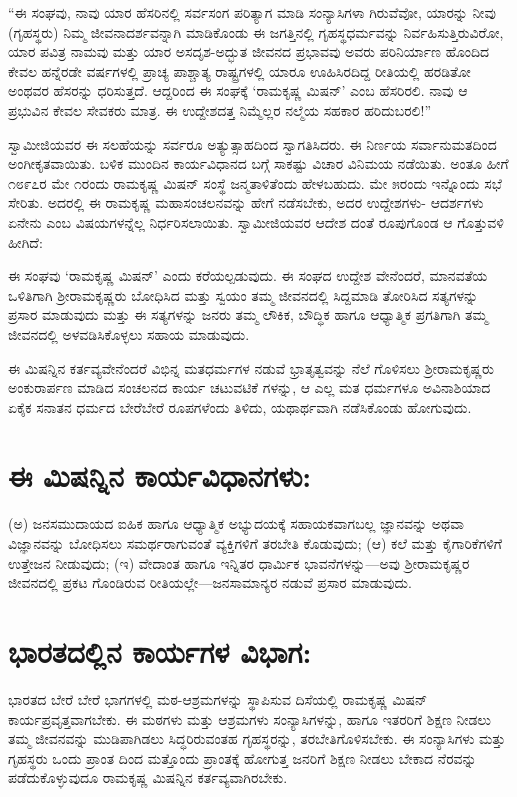 “ಈ ಸಂಘವು, ನಾವು ಯಾರ ಹೆಸರಿನಲ್ಲಿ ಸರ್ವಸಂಗ ಪರಿತ್ಯಾಗ ಮಾಡಿ ಸಂನ್ಯಾಸಿಗಳಾ ಗಿರುವೆವೋ, ಯಾರನ್ನು ನೀವು (ಗೃಹಸ್ಥರು) ನಿಮ್ಮ ಜೀವನಾದರ್ಶವನ್ನಾಗಿ ಮಾಡಿಕೊಂಡು ಈ ಜಗತ್ತಿನಲ್ಲಿ ಗೃಹಸ್ಥಧರ್ಮವನ್ನು ನಿರ್ವಹಿಸುತ್ತಿರುವಿರೋ, ಯಾರ ಪವಿತ್ರ ನಾಮವು ಮತ್ತು ಯಾರ ಅಸದೃಶ-ಅದ್ಭುತ ಜೀವನದ ಪ್ರಭಾವವು ಅವರು ಪರಿನಿರ್ಯಾಣ ಹೊಂದಿದ ಕೇವಲ ಹನ್ನೆರಡೇ ವರ್ಷಗಳಲ್ಲಿ ಪ್ರಾಚ್ಯ ಪಾಶ್ಚಾತ್ಯ ರಾಷ್ಟ್ರಗಳಲ್ಲಿ ಯಾರೂ ಊಹಿಸಿರದಿದ್ದ ರೀತಿಯಲ್ಲಿ ಹರಡಿತೋ ಅಂಥವರ ಹೆಸರನ್ನು ಧರಿಸುತ್ತದೆ. ಆದ್ದರಿಂದ ಈ ಸಂಘಕ್ಕೆ ‘ರಾಮಕೃಷ್ಣ ಮಿಷನ್​’ ಎಂಬ ಹೆಸರಿರಲಿ. ನಾವು ಆ ಪ್ರಭುವಿನ ಕೇವಲ ಸೇವಕರು ಮಾತ್ರ. ಈ ಉದ್ದೇಶದತ್ತ ನಿಮ್ಮೆಲ್ಲರ ನಲ್ಮೆಯ ಸಹಕಾರ ಹರಿದುಬರಲಿ!”

ಸ್ವಾಮೀಜಿಯವರ ಈ ಸಲಹೆಯನ್ನು ಸರ್ವರೂ ಅತ್ಯುತ್ಸಾಹದಿಂದ ಸ್ವಾಗತಿಸಿದರು. ಈ ನಿರ್ಣಯ ಸರ್ವಾನುಮತದಿಂದ ಅಂಗೀಕೃತವಾಯಿತು. ಬಳಿಕ ಮುಂದಿನ ಕಾರ್ಯವಿಧಾನದ ಬಗ್ಗೆ ಸಾಕಷ್ಟು ವಿಚಾರ ವಿನಿಮಯ ನಡೆಯಿತು. ಅಂತೂ ಹೀಗೆ ೧೮೯೭ರ ಮೇ ೧ರಂದು ರಾಮಕೃಷ್ಣ ಮಿಷನ್ ಸಂಸ್ಥೆ ಜನ್ಮತಾಳಿತೆಂದು ಹೇಳಬಹುದು. ಮೇ ೫ರಂದು ಇನ್ನೊಂದು ಸಭೆ ಸೇರಿತು. ಅದರಲ್ಲಿ ಈ ರಾಮಕೃಷ್ಣ ಮಹಾಸಂಚಲನವನ್ನು ಹೇಗೆ ನಡೆಸಬೇಕು, ಅದರ ಉದ್ದೇಶಗಳು- ಆದರ್ಶಗಳು ಏನೇನು ಎಂಬ ವಿಷಯಗಳನ್ನೆಲ್ಲ ನಿರ್ಧರಿಸಲಾಯಿತು. ಸ್ವಾಮೀಜಿಯವರ ಆದೇಶ ದಂತೆ ರೂಪುಗೊಂಡ ಆ ಗೊತ್ತುವಳಿ ಹೀಗಿದೆ:

ಈ ಸಂಘವು ‘ರಾಮಕೃಷ್ಣ ಮಿಷನ್​’ ಎಂದು ಕರೆಯಲ್ಪಡುವುದು. ಈ ಸಂಘದ ಉದ್ದೇಶ ವೇನೆಂದರೆ, ಮಾನವತೆಯ ಒಳಿತಿಗಾಗಿ ಶ್ರೀರಾಮಕೃಷ್ಣರು ಬೋಧಿಸಿದ ಮತ್ತು ಸ್ವಯಂ ತಮ್ಮ ಜೀವನದಲ್ಲಿ ಸಿದ್ದಮಾಡಿ ತೋರಿಸಿದ ಸತ್ಯಗಳನ್ನು ಪ್ರಸಾರ ಮಾಡುವುದು ಮತ್ತು ಈ ಸತ್ಯಗಳನ್ನು ಜನರು ತಮ್ಮ ಲೌಕಿಕ, ಬೌದ್ಧಿಕ ಹಾಗೂ ಆಧ್ಯಾತ್ಮಿಕ ಪ್ರಗತಿಗಾಗಿ ತಮ್ಮ ಜೀವನದಲ್ಲಿ ಅಳವಡಿಸಿಕೊಳ್ಳಲು ಸಹಾಯ ಮಾಡುವುದು.

ಈ ಮಿಷನ್ನಿನ ಕರ್ತವ್ಯವೇನೆಂದರೆ ವಿಭಿನ್ನ ಮತಧರ್ಮಗಳ ನಡುವೆ ಭ್ರಾತೃತ್ವವನ್ನು ನೆಲೆ ಗೊಳಿಸಲು ಶ್ರೀರಾಮಕೃಷ್ಣರು ಅಂಕುರಾರ್ಪಣ ಮಾಡಿದ ಸಂಚಲನದ ಕಾರ್ಯ ಚಟುವಟಿಕೆ ಗಳನ್ನು, ಆ ಎಲ್ಲ ಮತ ಧರ್ಮಗಳೂ ಅವಿನಾಶಿಯಾದ ಏಕೈಕ ಸನಾತನ ಧರ್ಮದ ಬೇರೆಬೇರೆ ರೂಪಗಳೆಂದು ತಿಳಿದು, ಯಥಾರ್ಥವಾಗಿ ನಡೆಸಿಕೊಂಡು ಹೋಗುವುದು.

\section{ಈ ಮಿಷನ್ನಿನ ಕಾರ್ಯವಿಧಾನಗಳು:}

(ಅ) ಜನಸಮುದಾಯದ ಐಹಿಕ ಹಾಗೂ ಆಧ್ಯಾತ್ಮಿಕ ಅಭ್ಯುದಯಕ್ಕೆ ಸಹಾಯಕವಾಗಬಲ್ಲ ಜ್ಞಾನವನ್ನು ಅಥವಾ ವಿಜ್ಞಾನವನ್ನು ಬೋಧಿಸಲು ಸಮರ್ಥರಾಗುವಂತೆ ವ್ಯಕ್ತಿಗಳಿಗೆ ತರಬೇತಿ ಕೊಡುವುದು; (ಆ) ಕಲೆ ಮತ್ತು ಕೈಗಾರಿಕೆಗಳಿಗೆ ಉತ್ತೇಜನ ನೀಡುವುದು; (ಇ) ವೇದಾಂತ ಹಾಗೂ ಇನ್ನಿತರ ಧಾರ್ಮಿಕ ಭಾವನೆಗಳನ್ನು—ಅವು ಶ್ರೀರಾಮಕೃಷ್ಣರ ಜೀವನದಲ್ಲಿ ಪ್ರಕಟ ಗೊಂಡಿರುವ ರೀತಿಯಲ್ಲೇ—ಜನಸಾಮಾನ್ಯರ ನಡುವೆ ಪ್ರಸಾರ ಮಾಡುವುದು.


\section{ಭಾರತದಲ್ಲಿನ ಕಾರ್ಯಗಳ ವಿಭಾಗ:}

ಭಾರತದ ಬೇರೆ ಬೇರೆ ಭಾಗಗಳಲ್ಲಿ ಮಠ-ಆಶ್ರಮಗಳನ್ನು ಸ್ಥಾಪಿಸುವ ದಿಸೆಯಲ್ಲಿ ರಾಮಕೃಷ್ಣ ಮಿಷನ್ ಕಾರ್ಯಪ್ರವೃತ್ತವಾಗಬೇಕು. ಈ ಮಠಗಳು ಮತ್ತು ಆಶ್ರಮಗಳು ಸಂನ್ಯಾಸಿಗಳನ್ನು, ಹಾಗೂ ಇತರರಿಗೆ ಶಿಕ್ಷಣ ನೀಡಲು ತಮ್ಮ ಜೀವನವನ್ನು ಮುಡಿಪಾಗಿಡಲು ಸಿದ್ಧರಿರುವಂತಹ ಗೃಹಸ್ಥರನ್ನು, ತರಬೇತಿಗೊಳಿಸಬೇಕು. ಈ ಸಂನ್ಯಾಸಿಗಳು ಮತ್ತು ಗೃಹಸ್ಥರು ಒಂದು ಪ್ರಾಂತ ದಿಂದ ಮತ್ತೊಂದು ಪ್ರಾಂತಕ್ಕೆ ಹೋಗುತ್ತ ಜನರಿಗೆ ಶಿಕ್ಷಣ ನೀಡಲು ಬೇಕಾದ ನೆರವನ್ನು ಪಡೆದುಕೊಳ್ಳುವುದೂ ರಾಮಕೃಷ್ಣ ಮಿಷನ್ನಿನ ಕರ್ತವ್ಯವಾಗಿರಬೇಕು.


